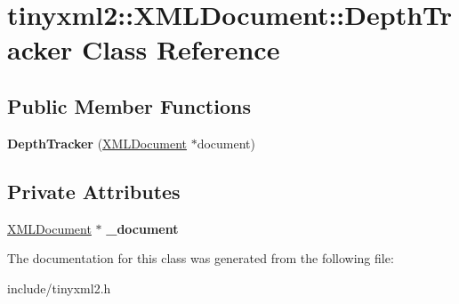\hypertarget{classtinyxml2_1_1XMLDocument_1_1DepthTracker}{}\section{tinyxml2\+::X\+M\+L\+Document\+::Depth\+Tracker Class Reference}
\label{classtinyxml2_1_1XMLDocument_1_1DepthTracker}
\subsection*{Public Member Functions}
\begin{DoxyCompactItemize}
\item 
\mbox{\label{classtinyxml2_1_1XMLDocument_1_1DepthTracker_ac2782a163c2da773b84cb2c610b79bcb}} 
{\bfseries Depth\+Tracker} (\mbox{\hyperlink{classtinyxml2_1_1XMLDocument}{X\+M\+L\+Document}} $\ast$document)
\end{DoxyCompactItemize}
\subsection*{Private Attributes}
\begin{DoxyCompactItemize}
\item 
\mbox{\label{classtinyxml2_1_1XMLDocument_1_1DepthTracker_ab142a47709c83a3698af1470378b9385}} 
\mbox{\hyperlink{classtinyxml2_1_1XMLDocument}{X\+M\+L\+Document}} $\ast$ {\bfseries \+\_\+document}
\end{DoxyCompactItemize}


The documentation for this class was generated from the following file\+:\begin{DoxyCompactItemize}
\item 
include/tinyxml2.\+h\end{DoxyCompactItemize}
